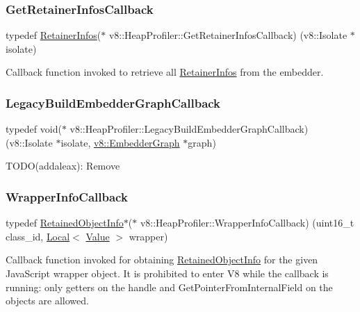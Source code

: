 \subsubsection{\texorpdfstring{Get\+Retainer\+Infos\+Callback}{GetRetainerInfosCallback}}
{\footnotesize\ttfamily typedef \mbox{\hyperlink{structv8_1_1HeapProfiler_1_1RetainerInfos}{Retainer\+Infos}}($\ast$ v8\+::\+Heap\+Profiler\+::\+Get\+Retainer\+Infos\+Callback) (v8\+::\+Isolate $\ast$isolate)}

Callback function invoked to retrieve all \mbox{\hyperlink{structv8_1_1HeapProfiler_1_1RetainerInfos}{Retainer\+Infos}} from the embedder. \mbox{\label{classv8_1_1HeapProfiler_aafaa85413706329f7767f559b701eb1a}} 
\subsubsection{\texorpdfstring{Legacy\+Build\+Embedder\+Graph\+Callback}{LegacyBuildEmbedderGraphCallback}}
{\footnotesize\ttfamily typedef void($\ast$ v8\+::\+Heap\+Profiler\+::\+Legacy\+Build\+Embedder\+Graph\+Callback) (v8\+::\+Isolate $\ast$isolate, \mbox{\hyperlink{classv8_1_1EmbedderGraph}{v8\+::\+Embedder\+Graph}} $\ast$graph)}

T\+O\+D\+O(addaleax)\+: Remove \mbox{\label{classv8_1_1HeapProfiler_a677025dd201fd832e0464e5ab0b0d0d4}} 
\subsubsection{\texorpdfstring{Wrapper\+Info\+Callback}{WrapperInfoCallback}}
{\footnotesize\ttfamily typedef \mbox{\hyperlink{classv8_1_1RetainedObjectInfo}{Retained\+Object\+Info}}$\ast$($\ast$ v8\+::\+Heap\+Profiler\+::\+Wrapper\+Info\+Callback) (uint16\+\_\+t class\+\_\+id, \mbox{\hyperlink{classv8_1_1Local}{Local}}$<$ \mbox{\hyperlink{classv8_1_1Value}{Value}} $>$ wrapper)}

Callback function invoked for obtaining \mbox{\hyperlink{classv8_1_1RetainedObjectInfo}{Retained\+Object\+Info}} for the given Java\+Script wrapper object. It is prohibited to enter V8 while the callback is running\+: only getters on the handle and Get\+Pointer\+From\+Internal\+Field on the objects are allowed. 

